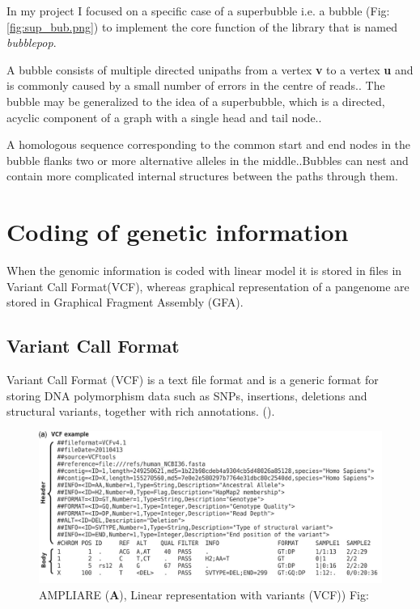 In my project I focused on a specific case of a superbubble i.e. a bubble (Fig: \ref{fig:sup_bub.png}) to implement the core function of the library that is named \textit{bubblepop}. 

A bubble consists of multiple directed unipaths from a vertex\textbf{ v} to a vertex \textbf{u} and is commonly caused by a small number of errors in the centre of reads.\cite{brankovic2016linear}. The bubble may be generalized to the idea of a superbubble, which is a directed, acyclic component of a graph with a single head and tail node.\cite{onodera2013detecting}.

A homologous sequence corresponding to the common start
and end nodes in the bubble flanks two or more alternative alleles in the middle.\cite{garrison2019graphical}.Bubbles can nest and contain more complicated internal structures between the paths
through them. 

\section{Coding of genetic information}

When the genomic information is coded with linear model it is stored in files in Variant Call Format(VCF), whereas graphical representation of a pangenome are stored in Graphical Fragment Assembly (GFA). 



\subsection{Variant Call Format}
Variant Call Format (VCF) is a text file format and is a generic format for storing DNA polymorphism data such as SNPs, insertions, deletions and structural variants, together with rich annotations. (\cite{10.1093/bioinformatics/btr330}). 


\begin{figure}[H]
\centering
\includegraphics[width=1.00\textwidth]{fig/vcf.png}
\decoRule
\caption{AMPLIARE (\textbf{A}), Linear representation with variants (VCF)) Fig:\cite{10.1093/bioinformatics/btr330}}
\label{fig:vcf.png}
\end{figure}



